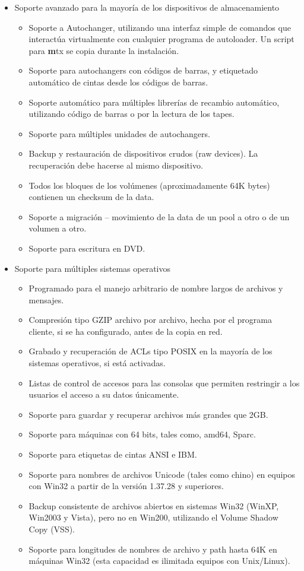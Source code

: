 \begin{itemize}
\item Soporte avanzado para la mayoría de los dispositivos de almacenamiento
    \begin{itemize}
   \item Soporte a Autochanger, utilizando una interfaz simple de comandos que interactúa 
      virtualmente con cualquier programa de autoloader. Un script para  {\textbf mtx} se
      copia durante la instalación.   
   \item Soporte para autochangers con códigos de barras, y etiquetado automático de cintas
      desde los códigos de barras.  
   \item Soporte automático para múltiples librerías de recambio automático, utilizando código
      de barras o por la lectura de los tapes.  
   \item Soporte para múltiples unidades de autochangers.
   \item Backup y restauración de dispositivos crudos (raw devices). La recuperación debe
      hacerse al mismo dispositivo. 
   \item Todos los bloques de los volúmenes (aproximadamente 64K bytes) contienen un checksum
         de la data.  
   \item Soporte a migración – movimiento de la data de un pool a otro o de un volumen a otro.
   \item Soporte para escritura en DVD.
   \end{itemize}

\item Soporte para múltiples sistemas operativos
   \begin{itemize} 
   \item Programado para el manejo arbitrario de nombre largos de archivos y mensajes.  
   \item Compresión tipo GZIP archivo por archivo, hecha por el programa cliente, si se ha
      configurado, antes de la copia en red.  
   \item Grabado y recuperación de ACLs tipo POSIX en la mayoría de los sistemas operativos,
      si está activadas. 
   \item Listas de control de accesos para las consolas que permiten restringir a los usuarios
      el acceso a su datos únicamente.  
   \item Soporte para guardar y recuperar archivos más grandes que 2GB.  
   \item Soporte para máquinas con 64 bits, tales como, amd64, Sparc.
   \item Soporte para etiquetas de cintas ANSI e IBM.
   \item Soporte para nombres de archivos Unicode (tales como chino) en equipos con Win32
         a partir de la versión 1.37.28 y superiores.
   \item Backup consistente de archivos abiertos en sistemas Win32 (WinXP, Win2003 y Vista), 
         pero no en Win200, utilizando el Volume Shadow Copy (VSS).
   \item Soporte para longitudes de nombres de archivo y path hasta 64K en máquinas Win32
         (esta capacidad es ilimitada equipos con Unix/Linux).
   \end{itemize}


\end{itemize}
